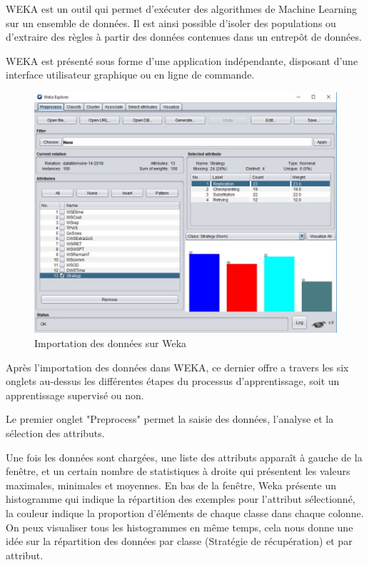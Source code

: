 WEKA est un outil qui permet d'exécuter des algorithmes de Machine Learning sur un ensemble de données. Il est ainsi possible d’isoler des populations ou d’extraire des règles à partir des données contenues dans un entrepôt de données. 

WEKA est présenté sous forme d’une application indépendante, disposant d’une interface utilisateur graphique ou en ligne de commande.


\begin{figure}[H]
\begin{center}
\includegraphics[width=1\linewidth]{images/weka1.JPG}
\end{center}
\caption{Importation des données sur Weka}
\label{fig:11}
\end{figure}

Après l'importation des données dans WEKA, ce dernier offre a travers les six onglets au-dessus les différentes étapes du processus d'apprentissage, soit un apprentissage supervisé ou non. 

Le premier onglet "Preprocess" permet la saisie des données, l'analyse et la sélection des attributs. 

Une fois les données sont chargées, une liste des attributs apparaît à gauche de la fenêtre, et un certain nombre de statistiques à droite qui présentent les valeurs maximales, minimales et moyennes.
En bas de la fenêtre, Weka présente un histogramme qui indique la répartition des exemples pour l'attribut sélectionné, la couleur indique la proportion d’éléments de chaque classe dans chaque colonne. On peux visualiser tous les histogrammes en même temps, cela nous donne une idée sur la répartition des données par classe (Stratégie de récupération) et par attribut. 

